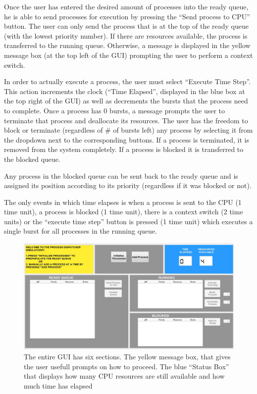 \documentclass{article}
\begin{document}
Once the user has entered the desired amount of processes into the ready queue, he is able to send processes for execution by pressing the ``Send process to CPU'' button. The user can only send the process that is at the top of the ready queue (with the lowest priority number). If there are resources available, the process is transferred to the running queue. Otherwise, a message is displayed in the yellow message box (at the top left of the GUI) prompting the user to perform a context switch.

In order to actually execute a process, the user must select ``Execute Time Step''. This action increments the clock (``Time Elapsed'', displayed in the blue box at the top right of the GUI) as well as decrements the bursts that the process need to complete. Once a process has 0 bursts, a message prompts the user to terminate that process and deallocate its resources. The user has the freedom to block or terminate (regardless of \# of bursts left) any process by selecting it from the dropdown next to the corresponding buttons. If a process is terminated, it is removed from the system completely. If a process is blocked it is transferred to the blocked queue. 

Any process in the blocked queue can be sent back to the ready queue and is assigned its position according to its priority (regardless if it was blocked or not).

The only events in which time elapses is when a process is sent to the CPU (1 time unit), a process is blocked (1 time unit), there is a context switch (2 time units) or the ``execute time step'' button is pressed (1 time unit) which executes a single burst for all processes in the running queue.

\begin{figure}[H]
 \centering
 \includegraphics[width=\linewidth]{ss1.JPG}
 \caption{The entire GUI has six sections. The yellow message box, that gives the user usefull prompts on how to proceed. The blue ``Status Box'' that displays how many CPU resources are still available and how much time has elapsed}
\end{figure}
\end{document}
